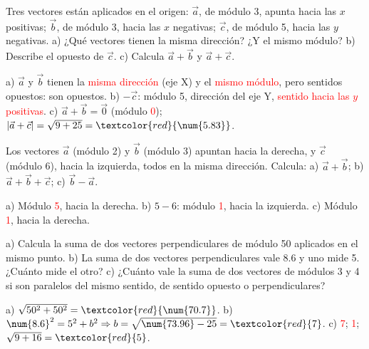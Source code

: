 \begin{exercise}
    Tres vectores están aplicados en el origen: \(\vec{a}\), de módulo 3, apunta hacia las \(x\) positivas; \(\vec{b}\), de módulo 3, hacia las \(x\) negativas; \(\vec{c}\), de módulo 5, hacia las \(y\) negativas. a) ¿Qué vectores tienen la misma dirección? ¿Y el mismo módulo? b) Describe el opuesto de \(\vec{c}\). c) Calcula \(\vec{a} + \vec{b}\) y \(\vec{a} + \vec{c}\).
    \begin{solu}
        a) \(\vec{a}\) y \(\vec{b}\) tienen la \textcolor{red}{misma dirección} (eje X) y el \textcolor{red}{mismo módulo}, pero sentidos opuestos: son opuestos.
        b) \(-\vec{c}\): módulo 5, dirección del eje Y, \textcolor{red}{sentido hacia las \(y\) positivas}.
        c) \(\vec{a} + \vec{b} = \vec{0}\) (módulo \textcolor{red}{0}); \(|\vec{a} + \vec{c}| = \sqrt{9 + 25} = \textcolor{red}{\num{5.83}}\).
    \end{solu}
\end{exercise}

\begin{exercise}
    Los vectores \(\vec{a}\) (módulo 2) y \(\vec{b}\) (módulo 3) apuntan hacia la derecha, y \(\vec{c}\) (módulo 6), hacia la izquierda, todos en la misma dirección. Calcula: a) \(\vec{a} + \vec{b}\); b) \(\vec{a} + \vec{b} + \vec{c}\); c) \(\vec{b} - \vec{a}\).
    \begin{solu}
        a) Módulo \textcolor{red}{5}, hacia la derecha. b) \(5 - 6\): módulo \textcolor{red}{1}, hacia la izquierda. c) Módulo \textcolor{red}{1}, hacia la derecha.
    \end{solu}
\end{exercise}

\begin{exercise}
    a) Calcula la suma de dos vectores perpendiculares de módulo 50 aplicados en el mismo punto. b) La suma de dos vectores perpendiculares vale \num{8.6} y uno mide 5. ¿Cuánto mide el otro? c) ¿Cuánto vale la suma de dos vectores de módulos 3 y 4 si son paralelos del mismo sentido, de sentido opuesto o perpendiculares?
    \begin{solu}
        a) \(\sqrt{50^2 + 50^2} = \textcolor{red}{\num{70.7}}\).
        b) \(\num{8.6}^2 = 5^2 + b^2 \Rightarrow b = \sqrt{\num{73.96} - 25} = \textcolor{red}{7}\).
        c) \textcolor{red}{7}; \textcolor{red}{1}; \(\sqrt{9 + 16} = \textcolor{red}{5}\).
    \end{solu}
\end{exercise}

